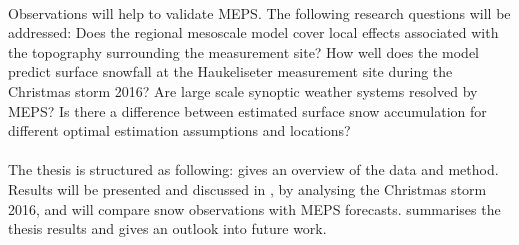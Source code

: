 \\
Observations will help to validate MEPS. The following research questions will be addressed: 
Does the regional mesoscale model cover local effects associated with the topography surrounding the measurement site? How well does the model predict surface snowfall at the Haukeliseter measurement site during the Christmas storm 2016? 
Are large scale synoptic weather systems resolved by MEPS?
Is there a difference between estimated surface snow accumulation for different optimal estimation assumptions and locations? 
\\
\\
The thesis is structured as following: %
 gives an overview of the data and method. Results will be presented and discussed in , by analysing the Christmas storm 2016, and  will compare snow observations with MEPS forecasts.  summarises the thesis results and gives an outlook into future work.

